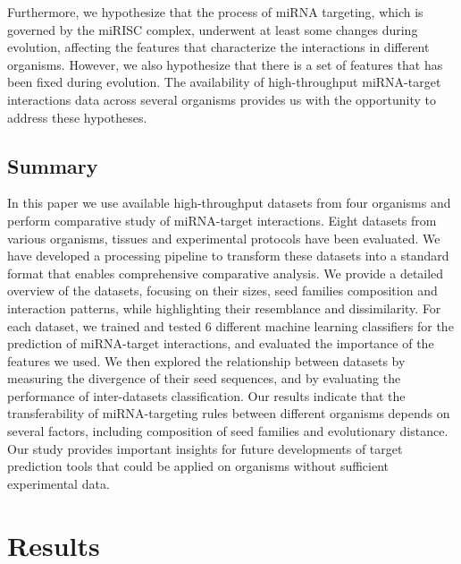\documentclass{bmcart}
\begin{document}
Furthermore, we hypothesize that the process of miRNA targeting, which is governed by the miRISC complex, underwent at least some changes during evolution, affecting the features that characterize the interactions in different organisms. However, we also hypothesize that there is a set of features that has been fixed during evolution. The availability of high-throughput miRNA-target interactions data across several organisms provides us with the opportunity to address these hypotheses. 

\subsection*{Summary}
In this paper we use available high-throughput datasets from four organisms and perform comparative study of miRNA-target interactions. Eight datasets from various organisms, tissues and experimental protocols have been evaluated. We have developed a processing pipeline to transform these datasets into a standard format that enables comprehensive comparative analysis. We provide a detailed overview of the datasets, focusing on their sizes, seed families composition and interaction patterns, while highlighting their resemblance and dissimilarity. For each dataset, we trained and tested 6 different machine learning classifiers for the prediction of miRNA-target interactions, and evaluated the importance of the features we used.
We then explored the relationship between datasets by measuring the divergence of their seed sequences, and by evaluating the performance of inter-datasets classification. Our results indicate that the transferability of miRNA-targeting rules between different organisms depends on several factors, including composition of seed families and evolutionary distance. Our study provides important insights for future developments of target prediction tools that could be applied on organisms without sufficient experimental data.



\clearpage
\section*{Results}
\end{document}

